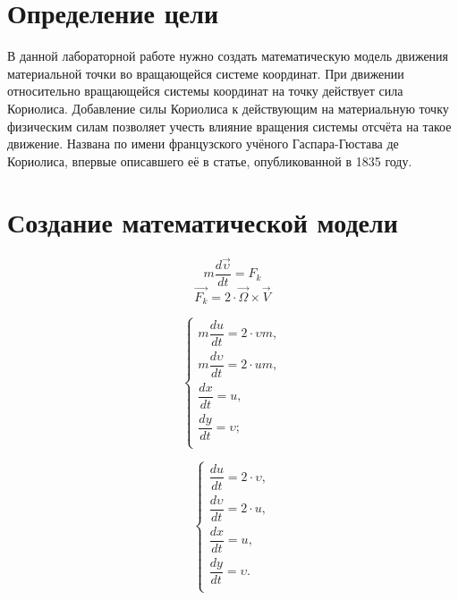 \documentclass[a4paper, 14pt]{extarticle}
\begin{document}
	\pagebreak	

	\section{Определение цели}
		В данной лабораторной работе нужно создать математическую модель движения материальной точки во вращающейся системе координат. При движении относительно вращающейся системы координат на точку действует сила Кориолиса. Добавление силы Кориолиса к действующим на материальную точку физическим силам позволяет учесть влияние вращения системы отсчёта на такое движение. Названа по имени французского учёного Гаспара-Гюстава де Кориолиса, впервые описавшего её в статье, опубликованной в 1835 году.

	\section{Создание математической модели}
		\[ m\dfrac{d\vec{\upsilon}}{dt} = F_k\]
		\[ \vec{F_k} = 2\cdot\vec{\Omega}\times\vec{V} \]
		
		\[\begin{cases}
			m\dfrac{du}{dt} = 2\cdot\upsilon m,\\
			m\dfrac{d\upsilon}{dt} = 2\cdot u m,\\
			\dfrac{dx}{dt} = u,\\
			\dfrac{dy}{dt} = \upsilon;\\
		\end{cases}\]
		
		\[\begin{cases}
			\dfrac{du}{dt} = 2\cdot\upsilon,\\
			\dfrac{d\upsilon}{dt} = 2\cdot u,\\
			\dfrac{dx}{dt} = u,\\
			\dfrac{dy}{dt} = \upsilon.\\
		\end{cases}\]
	
\end{document}
